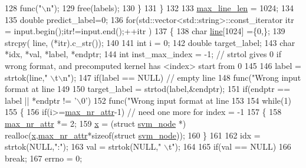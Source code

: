 \begin{DoxyCode}
{{128             func(\textcolor{stringliteral}{"\(\backslash\)n"});
129             free(labels);
130         \}
131     \}
132 
133     \hyperlink{class_svm_wrapper_a6921acb6aa7fdaf8a784c4e9df839ad1}{max\_line\_len} = 1024;
134 
135     \textcolor{keywordtype}{double} predict\_label=0;
136     \textcolor{keywordflow}{for}(std::vector<std::string>::const\_iterator itr = input.begin();itr!=input.end();++itr )
137     \{
138         \textcolor{keywordtype}{char} \hyperlink{svm-predict_8c_a8adb30f4f6669f927fd9232f686c637b}{line}[1024] =\{0,\};
139         strcpy( line, (*itr).c\_str());
140 
141         \textcolor{keywordtype}{int} i = 0;
142         \textcolor{keywordtype}{double} target\_label;
143         \textcolor{keywordtype}{char} *idx, *val, *label, *endptr;
144         \textcolor{keywordtype}{int} inst\_max\_index = -1; \textcolor{comment}{// strtol gives 0 if wrong format, and precomputed kernel has <index>
       start from 0}
145 
146         label = strtok(line,\textcolor{stringliteral}{" \(\backslash\)t\(\backslash\)n"});
147         \textcolor{keywordflow}{if}(label == NULL) \textcolor{comment}{// empty line}
148             func(\textcolor{stringliteral}{"Wrong input format at line %
149 
150         target\_label = strtod(label,&endptr);
151         \textcolor{keywordflow}{if}(endptr == label || *endptr != \textcolor{charliteral}{'\(\backslash\)0'})
152             func(\textcolor{stringliteral}{"Wrong input format at line %
153 
154         \textcolor{keywordflow}{while}(1)
155         \{
156             \textcolor{keywordflow}{if}(i>=\hyperlink{class_svm_wrapper_ac3f77511deba1c80caa8e7150097d8d6}{max\_nr\_attr}-1) \textcolor{comment}{// need one more for index = -1}
157             \{
158                 \hyperlink{class_svm_wrapper_ac3f77511deba1c80caa8e7150097d8d6}{max\_nr\_attr} *= 2;
159                 \hyperlink{class_svm_wrapper_abf0dcde4c2d3ec163b487fdf6cc883bc}{x} = (\textcolor{keyword}{struct }\hyperlink{structsvm__node}{svm\_node} *) realloc(\hyperlink{class_svm_wrapper_abf0dcde4c2d3ec163b487fdf6cc883bc}{x},\hyperlink{class_svm_wrapper_ac3f77511deba1c80caa8e7150097d8d6}{max\_nr\_attr}*\textcolor{keyword}{sizeof}(\textcolor{keyword}{struct} 
      \hyperlink{structsvm__node}{svm\_node}));
160             \}
161 
162             idx = strtok(NULL,\textcolor{stringliteral}{":"});
163             val = strtok(NULL,\textcolor{stringliteral}{" \(\backslash\)t"});
164 
165             \textcolor{keywordflow}{if}(val == NULL)
166                 \textcolor{keywordflow}{break};
167             errno = 0;
}}}}
\end{DoxyCode}
